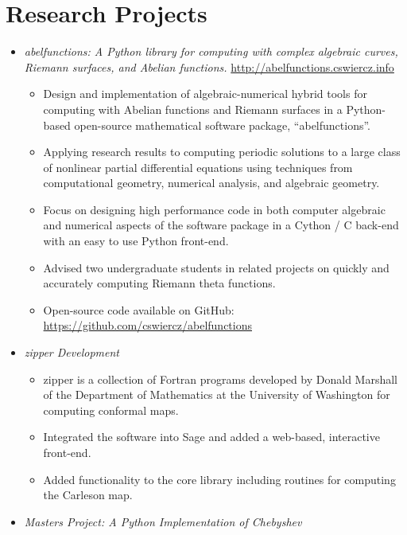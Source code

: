 \documentclass{article}
\begin{document}
\section*{Research Projects}



\begin{itemize}
  \item {\it {\sc abelfunctions}: A Python library for computing with
    complex algebraic curves, Riemann surfaces, and Abelian functions.}
    \url{http://abelfunctions.cswiercz.info}
    \begin{itemize}
    \item Design and implementation of algebraic-numerical hybrid
        tools for computing with Abelian functions and Riemann surfaces
        in a Python-based open-source mathematical software package,
        ``abelfunctions''.
      \item Applying research results to computing periodic solutions to a large
        class of nonlinear partial differential equations using techniques from
        computational geometry, numerical analysis, and algebraic geometry.
      \item Focus on designing high performance code in both computer algebraic
        and numerical aspects of the software package in a Cython / C back-end
        with an easy to use Python front-end.
      \item Advised two undergraduate students in related projects on
        quickly and accurately computing Riemann theta functions.
      \item Open-source code available on GitHub:
        \url{https://github.com/cswiercz/abelfunctions}
    \end{itemize}
  \item {\it {\sc zipper} Development}
    \begin{itemize}
      \item {\sc zipper} is a collection of Fortran programs developed by Donald
        Marshall of the Department of Mathematics at the University of
        Washington for computing conformal maps.
      \item Integrated the software into Sage and added a web-based, interactive
        front-end.
      \item Added functionality to the core library including routines for
        computing the Carleson map.
    \end{itemize}
  \item {\it Masters Project: A Python Implementation of Chebyshev
}
\end{itemize}
\end{document}
